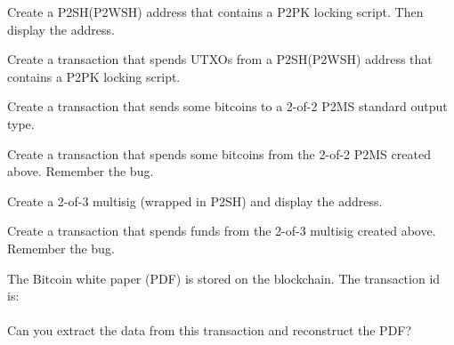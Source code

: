 \begin{exercise}
Create a P2SH(P2WSH) address that contains a P2PK locking script. Then display the address.
\end{exercise}

\begin{exercise}
Create a transaction that spends UTXOs from a P2SH(P2WSH) address that contains a P2PK locking script.
\end{exercise}

\begin{exercise}
Create a transaction that sends some bitcoins to a 2-of-2 P2MS standard output type. 
\end{exercise}

\begin{exercise}
Create a transaction that spends some bitcoins from the 2-of-2 P2MS created above. Remember the  bug.
\end{exercise}

\begin{exercise}
Create a 2-of-3 multisig (wrapped in P2SH) and display the address.
\end{exercise}

\begin{exercise}
Create a transaction that spends funds from the 2-of-3 multisig created above. Remember the  bug.
\end{exercise}


\begin{exercise}
The Bitcoin white paper (PDF) is stored on the blockchain. The transaction id is:\\

\\

Can you extract the data from this transaction and reconstruct the PDF?
\end{exercise}

